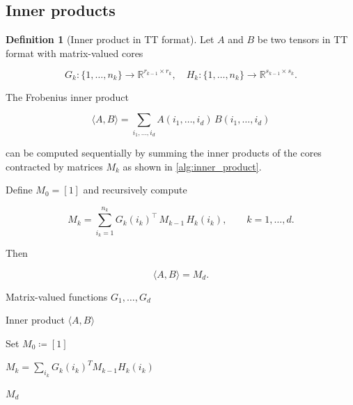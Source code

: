 \documentclass[11pt,a4paper,parskip=half-]{scrartcl}
\theoremstyle{definition}
\newtheorem{definition}{Definition}[section]
\theoremstyle{plain}
\theoremstyle{remark}
\begin{document}

\subsection{Inner products}
\label{sec:inner_product}

\begin{definition}[Inner product in TT format]

  Let $A$ and $B$ be two tensors in TT format with
  matrix-valued cores

  \[
    G_k : \{1,\dots,n_k\} \to \mathbb{R}^{r_{k-1}\times r_k},
    \quad
    H_k : \{1,\dots,n_k\} \to \mathbb{R}^{s_{k-1}\times s_k}.
  \]

  The Frobenius inner product

  \[
    \langle A,B \rangle
    =
    \sum_{i_1,\dots,i_d}
    A(i_1,\dots,i_d)\,
    B(i_1,\dots,i_d)
  \]

  can be computed sequentially by summing the inner products of
  the cores contracted by matrices $M_k$ as shown in \cref{alg:inner_product}.

  Define $M_0 = [1]$ and recursively compute

  \[
    M_k
    =
    \sum_{i_k=1}^{n_k}
    G_k(i_k)^\top
    \, M_{k-1} \,
    H_k(i_k),
    \qquad k=1,\dots,d.
  \]

  Then

  \[
    \langle A,B \rangle = M_d.
  \]

  \begin{algorithm}[t]
    \caption{Inner product in TT format}
    \label{alg:inner_product}
    \begin{algorithmic}[1]
      \Require Matrix-valued functions $G_1,\dots,G_d$

      \Ensure Inner product $\langle A,B \rangle$

      \State Set $M_0 \coloneqq [1]$ 


      \State $M_k = \sum_{i_k} G_k(i_k)^T M_{k-1} H_k(i_k)$

      \EndFor

      \State \Return $M_d$ 
    \end{algorithmic}
  \end{algorithm}
\end{definition}
\end{document}
